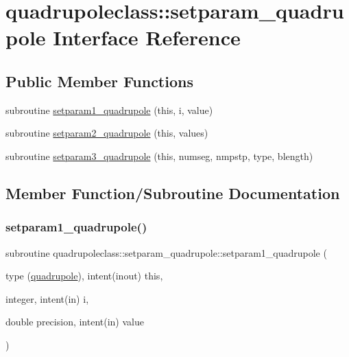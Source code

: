 \hypertarget{interfacequadrupoleclass_1_1setparam__quadrupole}{}\section{quadrupoleclass\+::setparam\+\_\+quadrupole Interface Reference}
\label{interfacequadrupoleclass_1_1setparam__quadrupole}
\subsection*{Public Member Functions}
\begin{DoxyCompactItemize}
\item 
subroutine \mbox{\hyperlink{interfacequadrupoleclass_1_1setparam__quadrupole_af1055fc2252a8acdfdb7416b377bcdbd}{setparam1\+\_\+quadrupole}} (this, i, value)
\item 
subroutine \mbox{\hyperlink{interfacequadrupoleclass_1_1setparam__quadrupole_a0afeab566ad2a8d00552ba6cd402943d}{setparam2\+\_\+quadrupole}} (this, values)
\item 
subroutine \mbox{\hyperlink{interfacequadrupoleclass_1_1setparam__quadrupole_a9efeed4d7a1e905ae01a5efa85c514cf}{setparam3\+\_\+quadrupole}} (this, numseg, nmpstp, type, blength)
\end{DoxyCompactItemize}


\subsection{Member Function/\+Subroutine Documentation}
\mbox{\label{interfacequadrupoleclass_1_1setparam__quadrupole_af1055fc2252a8acdfdb7416b377bcdbd}} 
\subsubsection{\texorpdfstring{setparam1\_quadrupole()}{setparam1\_quadrupole()}}
{\footnotesize\ttfamily subroutine quadrupoleclass\+::setparam\+\_\+quadrupole\+::setparam1\+\_\+quadrupole (\begin{DoxyParamCaption}\item[{type (\mbox{\hyperlink{namespacequadrupoleclass_structquadrupoleclass_1_1quadrupole}{quadrupole}}), intent(inout)}]{this,  }\item[{integer, intent(in)}]{i,  }\item[{double precision, intent(in)}]{value }\end{DoxyParamCaption})}

